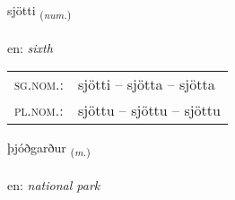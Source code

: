 \documentclass[frontgrid, backgrid]{flacards}\usepackage[]{graphicx}\usepackage[]{xcolor}
\begin{document}
\renewcommand{\flhead}{\vskip5pt \fboxsep=0pt {\small\bfseries\footnotesize Töluorð | Numeral}}
\renewcommand{\fcfoot}{\vskip5pt \fboxsep=0pt \hspace{2pt}{\small\bfseries\footnotesize 3K}}

\renewcommand{\blhead}{\vskip5pt {\small\bfseries\footnotesize Töluorð | Numeral }}
\renewcommand{\bcfoot}{\vskip5pt \hspace{2pt}{\small\bfseries\footnotesize 3K}}


{sjötti \small{\textsubscript{(\textit{num.})}} \\[1ex] %
\textphonetic{[sjœhtɪ]} \\
en: \emph{sixth} \\  [2ex]
\renewcommand*{\arraystretch}{0.8}
\begin{tabular}{ll}
\textsc{sg.nom.}: & sjötti  --  sjötta -- sjötta \\ 
\textsc{pl.nom.}: & sjöttu -- sjöttu -- sjöttu
\end{tabular}
}

\renewcommand{\flhead}{\vskip5pt \fboxsep=0pt {\small\bfseries\footnotesize Nafnorð | Noun}}
\renewcommand{\fcfoot}{\vskip5pt \fboxsep=0pt \hspace{2pt}{\small\bfseries\footnotesize 3K}}

\renewcommand{\blhead}{\vskip5pt {\small\bfseries\footnotesize Nafnorð | Noun }}
\renewcommand{\bcfoot}{\vskip5pt \hspace{2pt}{\small\bfseries\footnotesize 3K}}


{þjóðgarður \small{\textsubscript{(\textit{m.})}} \\[1ex] %
\textphonetic{[θjouðkarðʏr]} \\
en: \emph{national park} \\  [2ex]
\renewcommand*{\arraystretch}{0.8}
}
\end{document}
